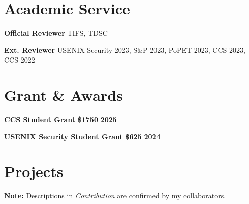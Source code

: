 \documentclass{resume}
\begin{document}
\section{Academic Service}
\begin{content}
	{\bf Official Reviewer} \enspace TIFS, TDSC

		{\bf Ext. Reviewer} \enspace USENIX Security 2023, S\&P 2023, PoPET 2023, CCS 2023, CCS 2022
\end{content}

\section{Grant \& Awards}
\begin{content}
	\textbf{CCS Student Grant} \textbf{\$1750} \hfill \textbf{2025}

	\textbf{USENIX Security Student Grant} \textbf{\$625} \hfill \textbf{2024}
\end{content}

\section{Projects}

\textbf{Note:} Descriptions in \underline{\textit{Contribution}} are confirmed by my collaborators.
\end{document}
